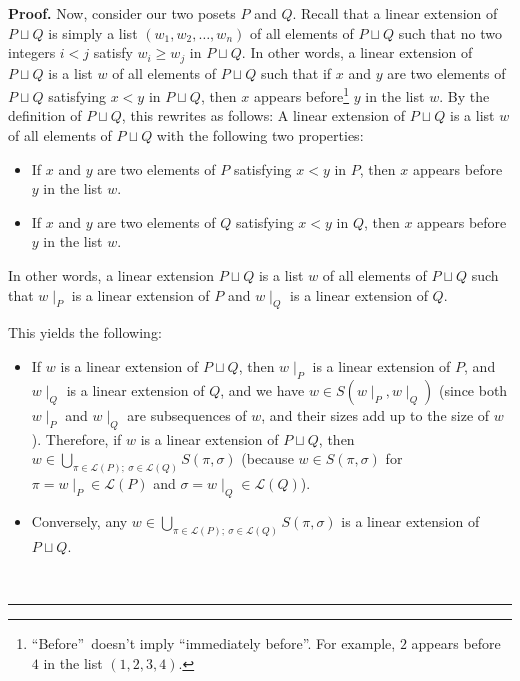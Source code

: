 \documentclass[numbers=enddot,12pt,final,onecolumn,notitlepage]{scrartcl}%
\theoremstyle{definition}
\newenvironment{proof}[1][Proof]{\noindent\textbf{#1.} }{\ \rule{0.5em}{0.5em}}
\newenvironment{verlong}{}{}
\begin{document}
\begin{verlong}
\begin{proof}
Now, consider our two posets $P$ and $Q$. Recall that a linear extension of
$P\sqcup Q$ is simply a list $\left(  w_{1},w_{2},\ldots,w_{n}\right)  $ of
all elements of $P\sqcup Q$ such that no two integers $i<j$ satisfy $w_{i}\geq
w_{j}$ in $P\sqcup Q$. In other words, a linear extension of $P\sqcup Q$ is a
list $w$ of all elements of $P\sqcup Q$ such that if $x$ and $y$ are two
elements of $P\sqcup Q$ satisfying $x<y$ in $P\sqcup Q$, then $x$ appears
before\footnote{\textquotedblleft Before\textquotedblright\ doesn't imply
\textquotedblleft immediately before\textquotedblright. For example, $2$
appears before $4$ in the list $\left(  1,2,3,4\right)  $.} $y$ in the list
$w$. By the definition of $P\sqcup Q$, this rewrites as follows: A linear
extension of $P\sqcup Q$ is a list $w$ of all elements of $P\sqcup Q$ with the
following two properties:

\begin{itemize}
\item If $x$ and $y$ are two elements of $P$ satisfying $x<y$ in $P$, then $x$
appears before $y$ in the list $w$.

\item If $x$ and $y$ are two elements of $Q$ satisfying $x<y$ in $Q$, then $x$
appears before $y$ in the list $w$.
\end{itemize}

In other words, a linear extension $P\sqcup Q$ is a list $w$ of all elements
of $P\sqcup Q$ such that $w\mid_{P}$ is a linear extension of $P$ and
$w\mid_{Q}$ is a linear extension of $Q$.

This yields the following:

\begin{itemize}
\item If $w$ is a linear extension of $P\sqcup Q$, then $w\mid_{P}$ is a
linear extension of $P$, and $w\mid_{Q}$ is a linear extension of $Q$, and we
have $w\in S\left(  w\mid_{P},w\mid_{Q}\right)  $ (since both $w\mid_{P}$ and
$w\mid_{Q}$ are subsequences of $w$, and their sizes add up to the size of
$w$). Therefore, if $w$ is a linear extension of $P\sqcup Q$, then
$w\in\bigcup_{\pi\in\mathcal{L}\left(  P\right)  ;\ \sigma\in\mathcal{L}%
\left(  Q\right)  }S\left(  \pi,\sigma\right)  $ (because $w\in S\left(
\pi,\sigma\right)  $ for $\pi=w\mid_{P}\in\mathcal{L}\left(  P\right)  $ and
$\sigma=w\mid_{Q}\in\mathcal{L}\left(  Q\right)  $).

\item Conversely, any $w\in\bigcup_{\pi\in\mathcal{L}\left(  P\right)
;\ \sigma\in\mathcal{L}\left(  Q\right)  }S\left(  \pi,\sigma\right)  $ is a
linear extension of $P\sqcup Q$.
\end{itemize}


\end{proof}
\end{verlong}
\end{document}
